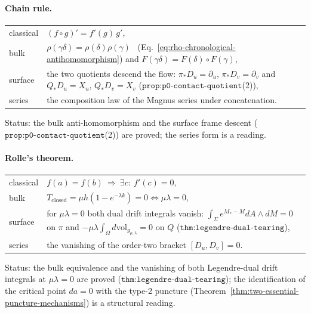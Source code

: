 \paragraph{Chain rule.} \hfill
\begin{center}
\begin{tabular}{lp{}}
classical & $(f\circ g)'=f'(g)\,g'$,\\[2pt]
bulk & $\rho(\gamma\delta)=\rho(\delta)\rho(\gamma)$
  \ (Eq.~\eqref{eq:rho-chronological-antihomomorphism}) and
  $F(\gamma\delta)=F(\delta)\circ F(\gamma)$,\\[2pt]
surface & the two quotients descend the flow:
  $\pi_*D_u=\partial_u$, $\pi_*D_v=\partial_v$ and
  $Q_*D_u=X_u$, $Q_*D_v=X_v$
  ($\texttt{prop:p0-contact-quotient}$(2)),\\[2pt]
series & the composition law of the Magnus series under concatenation.
\end{tabular}
\end{center}
{\small Status: the bulk anti-homomorphism and the surface frame descent
($\texttt{prop:p0-contact-quotient}$(2)) are proved; the series form is a
reading.}

\paragraph{Rolle's theorem.} \hfill
\begin{center}
\begin{tabular}{lp{}}
classical & $f(a)=f(b)\ \Longrightarrow\ \exists c:\ f'(c)=0$,\\[2pt]
bulk & $T_{\mathrm{closed}}=\mu h(1-e^{-\lambda k})=0\iff\mu\lambda=0$,\\[2pt]
surface & for $\mu\lambda=0$ both dual drift integrals vanish:
  $\int_{\Sigma}e^{M_*-M}dA\wedge dM=0$ on $\pi$ and
  $-\mu\lambda\int_\Omega d\mathrm{vol}_{g_{\mu,\lambda}}=0$ on $Q$
  ($\texttt{thm:legendre-dual-tearing}$),\\[2pt]
series & the vanishing of the order-two bracket $[D_u,D_v]=0$.
\end{tabular}
\end{center}
{\small Status: the bulk equivalence and the vanishing of both Legendre-dual
drift integrals at $\mu\lambda=0$ are proved
($\texttt{thm:legendre-dual-tearing}$); the identification of the critical point
$da=0$ with the type-2 puncture
(Theorem~\ref{thm:two-essential-puncture-mechanisms}) is a structural reading.}

